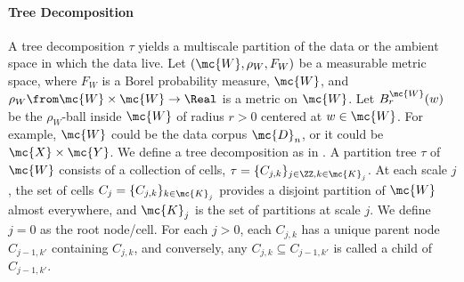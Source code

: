 \paragraph{Tree Decomposition}
A tree decomposition $\tau$ yields a multiscale partition of the data or the ambient space in which the data live.
Let $(\mc{W},\rho_W, F_W)$ be a measurable metric space, where $F_W$ is a Borel probability measure, $\mc{W}$, and $\rho_W \from \mc{W} \times \mc{W} \to \Real$ is a metric on $\mc{W}$.  Let $B_r^{\mc{W}}(w)$ be the $\rho_W$-ball inside $\mc{W}$ of radius $r > 0$ centered at $w \in \mc{W}$. For example, $\mc{W}$ could be the data corpus $\mc{D}_n$, or it could be $\mc{X} \times \mc{Y}$. We define a tree decomposition as in \cite{Allard2012,ChenMaggioni12}.  A partition tree $\tau$ of $\mc{W}$ consists of a collection of cells, $\tau=\{C_{j,k}\}_{j \in \ZZ, k \in \mc{K}_j}$.  At each scale $j$, the set of cells $C_j=\{C_{j,k}\}_{k \in \mc{K}_j}$ provides a disjoint partition of $\mc{W}$ almost everywhere, and $\mc{K}_j$ is the set of partitions at scale $j$.  We define $j=0$ as the root node/cell.  For each $j > 0$,  each $C_{j,k}$ has a unique parent node $C_{j-1,k'}$ containing $C_{j,k}$, and conversely, any $C_{j,k} \subseteq C_{j-1,k'}$ is called a child of $C_{j-1,k'}$.



